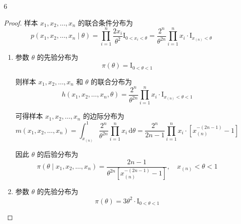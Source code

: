 \documentclass[normal,cn]{elegantnote}
\begin{document}
\begin{enumerate}
\begin{proof}
\begin{enumerate}
                      若采用后验期望估计，则 $\theta$ 的贝叶斯估计为
                      \begin{equation*}
                          \hat{\theta}_{B}=\frac{5}{5+15}=0.25
                      \end{equation*}
            \end{enumerate}
        \end{proof}
    \item[6]
        \begin{proof}
            样本 $x_{1},x_{2},\ldots,x_{n}$ 的联合条件分布为
            \begin{equation*}
                p\left(x_{1},x_{2},\ldots,x_{n}\mid\theta\right)=\prod_{i=1}^{n}\frac{2x_{i}}{\theta^{2}}\mathrm{I}_{0<x_{i}<\theta}=\frac{2^{n}}{\theta^{2n}}\prod_{i=1}^{n}x_{i}\cdot\mathrm{I}_{x_{(n)}<\theta}
            \end{equation*}
            \begin{enumerate}
                \item
                      参数 $\theta$ 的先验分布为
                      \begin{equation*}
                          \pi(\theta)=\mathrm{I}_{0<\theta<1}
                      \end{equation*}

                      则样本 $x_{1},x_{2},\ldots,x_{n}$ 和 $\theta$ 的联合分布为
                      \begin{equation*}
                          h\left(x_{1},x_{2},\ldots,x_{n},\theta\right)=\frac{2^{n}}{\theta^{2n}}\prod_{i=1}^{n}x_{i}\cdot\mathrm{I}_{x_{(n)}<\theta<1}
                      \end{equation*}

                      可得样本 $x_{1},x_{2},\ldots,x_{n}$ 的边际分布为
                      \begin{equation*}
                          m\left(x_{1},x_{2},\ldots,x_{n}\right)=\int_{x_{(n)}}^{1}\frac{2^{n}}{\theta^{2n}}\prod_{i=1}^{n}x_{i}\,\mathrm{d}\theta=\frac{2^{n}}{2n-1}\prod_{i=1}^{n}x_{i}\cdot\left[x_{(n)}^{-(2n-1)}-1\right]
                      \end{equation*}

                      因此 $\theta$ 的后验分布为
                      \begin{equation*}
                          \pi\left(\theta\mid x_{1},x_{2},\ldots,x_{n}\right)=\frac{2n-1}{\theta^{2n}\left[x_{(n)}^{-(2n-1)}-1\right]},\quad x_{(n)}<\theta<1
                      \end{equation*}
                \item
                      参数 $\theta$ 的先验分布为
                      \begin{equation*}
                          \pi(\theta)=3\theta^{2}\cdot\mathrm{I}_{0<\theta<1}
                      \end{equation*}


\end{enumerate}
\end{proof}
\end{enumerate}
\end{document}
